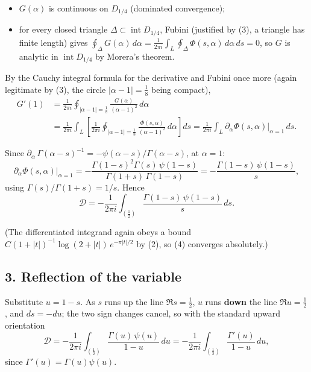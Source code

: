 \documentclass[11pt]{article}
\theoremstyle{remark}
\begin{document}
\begin{itemize}
\item $G(\alpha)$ is continuous on $D_{1/4}$ (dominated convergence);
\item for every closed triangle $\Delta\subset \operatorname{int}D_{1/4}$, Fubini (justified by (3), a triangle has finite length) gives $\oint_{\Delta}G(\alpha)\,d\alpha=\frac{1}{2\pi i}\int_L\oint_\Delta \Phi(s,\alpha)\,d\alpha\,ds=0$, so $G$ is analytic in $\operatorname{int}D_{1/4}$ by Morera's theorem.
\end{itemize}

By the Cauchy integral formula for the derivative and Fubini once more (again legitimate by (3), the circle $|\alpha-1|=\tfrac18$ being compact),
\begin{equation*}
\begin{aligned}
G'(1)&=\frac{1}{2\pi i}\oint_{|\alpha-1|=\frac18}\frac{G(\alpha)}{(\alpha-1)^2}\,d\alpha\\
&=\frac{1}{2\pi i}\int_L\left[\frac{1}{2\pi i}\oint_{|\alpha-1|=\frac18}\frac{\Phi(s,\alpha)}{(\alpha-1)^2}\,d\alpha\right]ds
=\frac{1}{2\pi i}\int_L \partial_\alpha\Phi(s,\alpha)\Big|_{\alpha=1}\,ds .
\end{aligned}
\end{equation*}

Since $\partial_\alpha\,\Gamma(\alpha-s)^{-1}=-\psi(\alpha-s)/\Gamma(\alpha-s)$, at $\alpha=1$:
\[
\partial_\alpha\Phi(s,\alpha)\Big|_{\alpha=1}
=-\frac{\Gamma(1-s)^2\Gamma(s)\,\psi(1-s)}{\Gamma(1+s)\,\Gamma(1-s)}
=-\frac{\Gamma(1-s)\,\psi(1-s)}{s},
\]
using $\Gamma(s)/\Gamma(1+s)=1/s$. Hence
\begin{equation*}
\mathcal{D}=-\frac{1}{2\pi i}\int_{(\frac12)}\frac{\Gamma(1-s)\,\psi(1-s)}{s}\,ds . \tag{4}
\end{equation*}

(The differentiated integrand again obeys a bound $C(1+|t|)^{-1}\log(2+|t|)\,e^{-\pi|t|/2}$ by (2), so (4) converges absolutely.)

\subsection*{3. Reflection of the variable}

Substitute $u=1-s$. As $s$ runs up the line $\Re s=\tfrac12$, $u$ runs \textbf{down} the line $\Re u=\tfrac12$, and $ds=-du$; the two sign changes cancel, so with the standard upward orientation
\begin{equation*}
\mathcal{D}=-\frac{1}{2\pi i}\int_{(\frac12)}\frac{\Gamma(u)\,\psi(u)}{1-u}\,du
=-\frac{1}{2\pi i}\int_{(\frac12)}\frac{\Gamma'(u)}{1-u}\,du , \tag{5}
\end{equation*}
since $\Gamma'(u)=\Gamma(u)\psi(u)$.
\end{document}
